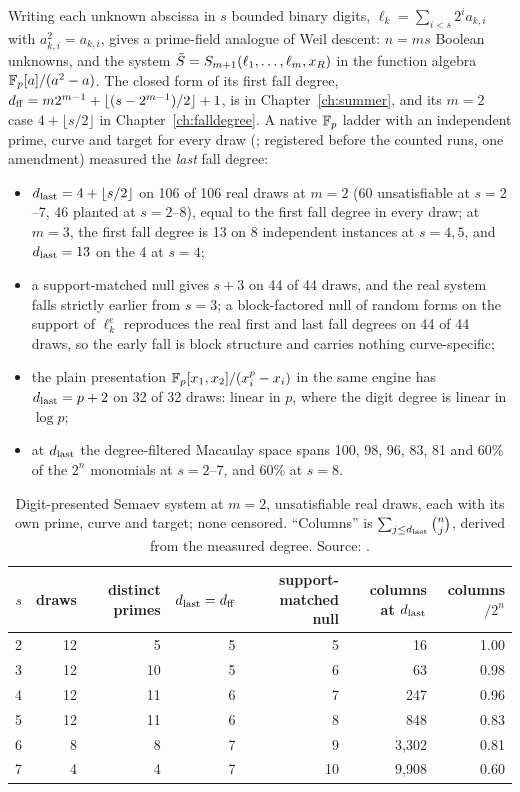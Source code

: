 Writing each unknown abscissa in $s$ bounded binary digits,
$\ell_k=\sum_{i<s}2^ia_{k,i}$ with $a_{k,i}^2=a_{k,i}$, gives a prime-field
analogue of Weil descent: $n=ms$ Boolean unknowns, and the system
$\tilde S=S_{m+1}(\ell_1,\dots,\ell_m,x_R)$ in the function algebra
$\mathbb{F}_p[a]/(a^2-a)$. The closed form of its first fall degree,
$d_{\rm ff}=m2^{m-1}+\lfloor(s-2^{m-1})/2\rfloor+1$, is in
Chapter~\ref{ch:summer}, and its $m=2$ case $4+\lfloor s/2\rfloor$ in
Chapter~\ref{ch:falldegree}. A native $\mathbb{F}_p$ ladder with an independent
prime, curve and target for every draw
(; registered before the
counted runs, one amendment) measured the \emph{last} fall degree:
\begin{itemize}
\item $d_{\rm last}=4+\lfloor s/2\rfloor$ on 106 of 106 real draws at $m=2$
  (60 unsatisfiable at $s=2$--7, 46 planted at $s=2$--8), equal to the first
  fall degree in every draw; at $m=3$, the first fall degree is 13 on 8
  independent instances at $s=4,5$, and $d_{\rm last}=13$ on the 4 at $s=4$;
\item a support-matched null gives $s+3$ on 44 of 44 draws, and the real
  system falls strictly earlier from $s=3$; a block-factored null of random
  forms on the support of $\ell_k^e$ reproduces the real first and last fall
  degrees on 44 of 44 draws, so the early fall is block structure and
  carries nothing curve-specific;
\item the plain presentation $\mathbb{F}_p[x_1,x_2]/(x_i^p-x_i)$ in the same engine
  has $d_{\rm last}=p+2$ on 32 of 32 draws: linear in $p$, where the digit
  degree is linear in $\log p$;
\item at $d_{\rm last}$ the degree-filtered Macaulay space spans 100, 98,
  96, 83, 81 and 60\% of the $2^n$ monomials at $s=2$--7, and 60\% at $s=8$.
\end{itemize}
\begin{table}[t]
\centering\small
\begin{tabular}{@{}rrrrrrr@{}}
\toprule
$s$ & draws & distinct primes & $d_{\rm last}=d_{\rm ff}$ & support-matched null & columns at $d_{\rm last}$ & columns$/2^n$ \\
\midrule
2 & 12 & 5 & 5 & 5 & 16 & 1.00 \\
3 & 12 & 10 & 5 & 6 & 63 & 0.98 \\
4 & 12 & 11 & 6 & 7 & 247 & 0.96 \\
5 & 12 & 11 & 6 & 8 & 848 & 0.83 \\
6 & 8 & 8 & 7 & 9 & 3{,}302 & 0.81 \\
7 & 4 & 4 & 7 & 10 & 9{,}908 & 0.60 \\
\bottomrule
\end{tabular}
\caption[]{Digit-presented Semaev system at $m=2$, unsatisfiable real
draws, each with its own prime, curve and target; none censored.
``Columns'' is $\sum_{j\le d_{\rm last}}\binom nj$, derived from the
measured degree. Source: .}
\label{tab:pa-digit}
\end{table}

